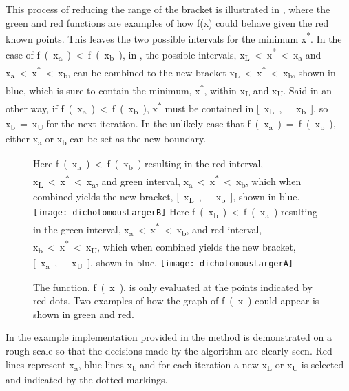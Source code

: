 This process of reducing the range of the bracket is illustrated in , where the green and red functions are examples of how f(x) could behave given the red known points. This leaves the two possible intervals for the minimum \si{x^*}. In the case of \si{f(x_a) < f(x_b)}, in , the possible intervals, \si{x_{L} < x^* < x_a} and \si{x_a < x^* < x_b}, can be combined to the new bracket \si{x_{L} < x^* < x_b}, shown in blue, which is sure to contain the minimum, \si{x^*}, within \si{x_{L}} and \si{x_{U}}. Said in an other way, if \si{f(x_a) < f(x_b)}, \si{x^*} must be contained in \si{[x_{L},\ x_b]}, so \si{x_b = x_{U}} for the next iteration. In the unlikely case that \si{f(x_a) = f(x_b)}, either \si{x_a} or \si{x_b} can be set as the new boundary.\cite{AAntoniou}
%
\begin{figure}[H]
  \begin{minipage}{\linewidth}
    \captionsetup[subfigure]{font = footnotesize}
    \centering
    \subcaptionbox
    {
      Here \si{f(x_a) < f(x_b)} resulting in the red interval, \si{x_{L} < x^* < x_a}, and green interval, \si{x_a < x^* < x_b}, which when combined yields the new bracket, \si{[x_{L},\ x_b]}, shown in blue.
      \label{dichotomousLargerB}
    }
    {
      \texttt{[image: dichotomousLargerB]}
    }\quad
    \subcaptionbox
    {
      Here \si{f(x_b) < f(x_a)} resulting in the green interval, \si{x_a < x^* < x_b}, and red interval, \si{x_b < x^* < x_{U}}, which when combined yields the new bracket, \si{[x_a,\ x_{U}]}, shown in blue.
      \label{dichotomousLargerA}
    }
    {
      \texttt{[image: dichotomousLargerA]}
    }
    \caption{The function, \si{f(x)}, is only evaluated at the points indicated by red dots. Two examples of how the graph of \si{f(x)} could appear is shown in green and red.}
    \label{dichotomousLargerAorB}
  \end{minipage}
\end{figure}\vspace{-18pt}
%
In the example implementation provided in  the method is demonstrated on a rough scale so that the decisions made by the algorithm are clearly seen. Red lines represent \si{x_a}, blue lines \si{x_b} and for each iteration a new \si{x_{L}} or \si{x_{U}} is selected and indicated by the dotted markings.
%
